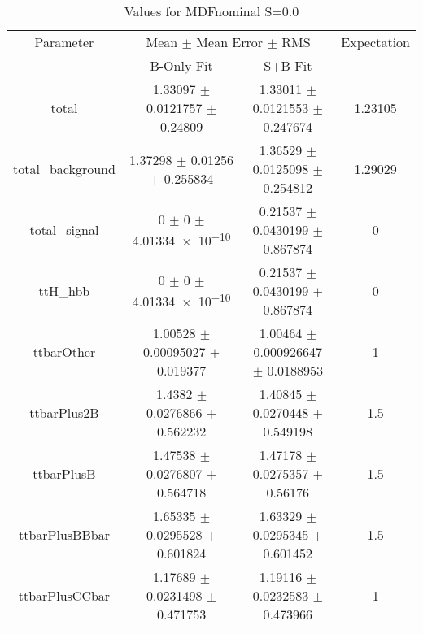 \begin{table}
\centering
\caption{Values for MDFnominal S=0.0}
\begin{tabular}{cccc}
\toprule
Parameter & \multicolumn{2}{c}{Mean $\pm$ Mean Error $\pm$ RMS} & Expectation\\
 & B-Only Fit & S+B Fit & \\
\midrule
total & \num{1.33097} $\pm$ \num{0.0121757} $\pm$ \num{0.24809} & \num{1.33011} $\pm$ \num{0.0121553} $\pm$ \num{0.247674} & \num{1.23105}\\
total\_background & \num{1.37298} $\pm$ \num{0.01256} $\pm$ \num{0.255834} & \num{1.36529} $\pm$ \num{0.0125098} $\pm$ \num{0.254812} & \num{1.29029}\\
total\_signal & \num{0} $\pm$ \num{0} $\pm$ \num{4.01334e-10} & \num{0.21537} $\pm$ \num{0.0430199} $\pm$ \num{0.867874} & \num{0}\\
ttH\_hbb & \num{0} $\pm$ \num{0} $\pm$ \num{4.01334e-10} & \num{0.21537} $\pm$ \num{0.0430199} $\pm$ \num{0.867874} & \num{0}\\
ttbarOther & \num{1.00528} $\pm$ \num{0.00095027} $\pm$ \num{0.019377} & \num{1.00464} $\pm$ \num{0.000926647} $\pm$ \num{0.0188953} & \num{1}\\
ttbarPlus2B & \num{1.4382} $\pm$ \num{0.0276866} $\pm$ \num{0.562232} & \num{1.40845} $\pm$ \num{0.0270448} $\pm$ \num{0.549198} & \num{1.5}\\
ttbarPlusB & \num{1.47538} $\pm$ \num{0.0276807} $\pm$ \num{0.564718} & \num{1.47178} $\pm$ \num{0.0275357} $\pm$ \num{0.56176} & \num{1.5}\\
ttbarPlusBBbar & \num{1.65335} $\pm$ \num{0.0295528} $\pm$ \num{0.601824} & \num{1.63329} $\pm$ \num{0.0295345} $\pm$ \num{0.601452} & \num{1.5}\\
ttbarPlusCCbar & \num{1.17689} $\pm$ \num{0.0231498} $\pm$ \num{0.471753} & \num{1.19116} $\pm$ \num{0.0232583} $\pm$ \num{0.473966} & \num{1}\\
\bottomrule
\end{tabular}
\end{table}